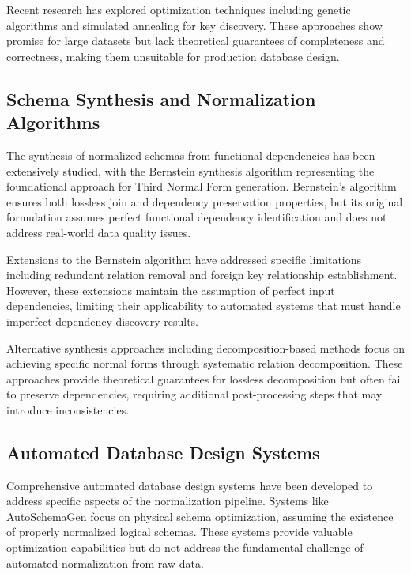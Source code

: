 \documentclass[acmsmall]{acmart}
\begin{document}
Recent research has explored optimization techniques including genetic algorithms \cite{genetic_keys2010} and simulated annealing \cite{sa_keys2012} for key discovery. These approaches show promise for large datasets but lack theoretical guarantees of completeness and correctness, making them unsuitable for production database design.

\subsection{Schema Synthesis and Normalization Algorithms}

The synthesis of normalized schemas from functional dependencies has been extensively studied, with the Bernstein synthesis algorithm \cite{bernstein1976} representing the foundational approach for Third Normal Form generation. Bernstein's algorithm ensures both lossless join and dependency preservation properties, but its original formulation assumes perfect functional dependency identification and does not address real-world data quality issues.

Extensions to the Bernstein algorithm \cite{bernstein_ext2005} have addressed specific limitations including redundant relation removal and foreign key relationship establishment. However, these extensions maintain the assumption of perfect input dependencies, limiting their applicability to automated systems that must handle imperfect dependency discovery results.

Alternative synthesis approaches including decomposition-based methods \cite{decomp_synthesis2008} focus on achieving specific normal forms through systematic relation decomposition. These approaches provide theoretical guarantees for lossless decomposition but often fail to preserve dependencies, requiring additional post-processing steps that may introduce inconsistencies.

\subsection{Automated Database Design Systems}

Comprehensive automated database design systems have been developed to address specific aspects of the normalization pipeline. Systems like AutoSchemaGen \cite{autoschema2015} focus on physical schema optimization, assuming the existence of properly normalized logical schemas. These systems provide valuable optimization capabilities but do not address the fundamental challenge of automated normalization from raw data.
\end{document}
